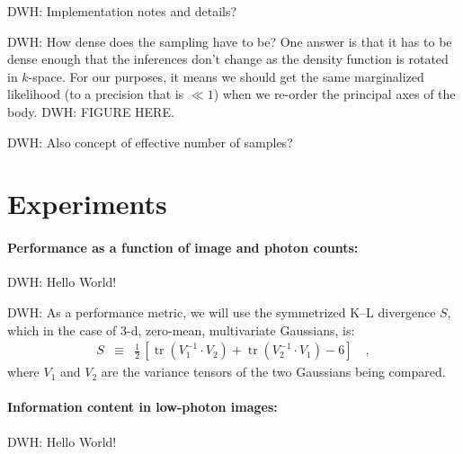 \documentclass[12pt]{article}
\DeclareMathOperator{\trace}{tr}
\begin{document}
DWH: Implementation notes and details?

DWH: How dense does the sampling have to be?  One answer is that it
has to be dense enough that the inferences don't change as the density
function is rotated in $k$-space.  For our purposes, it means we
should get the same marginalized likelihood (to a precision that is
$\ll 1$) when we re-order the principal axes of the body.  DWH: FIGURE HERE.

DWH: Also concept of effective number of samples?

\section{Experiments}

\paragraph{Performance as a function of image and photon counts:}
DWH: Hello World!

DWH: As a performance metric, we will use the symmetrized K--L
divergence $S$, which in the case of 3-d, zero-mean, multivariate
Gaussians, is:
\begin{eqnarray}
  S &\equiv& \frac{1}{2}\,\left[\trace(V_1^{-1}\cdot V_2)
                              + \trace(V_2^{-1}\cdot V_1)
                              - 6\right]
  \quad,
\end{eqnarray}
where $V_1$ and $V_2$ are the variance tensors of the two Gaussians
being compared.

\paragraph{Information content in low-photon images:}
DWH: Hello World!
\end{document}
